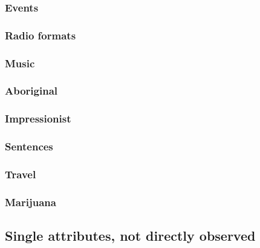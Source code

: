 \documentclass[11pt,letter]{article}
\begin{document}


\subsubsection{Events}



\subsubsection{Radio formats}



\subsubsection{Music}



\subsubsection{Aboriginal}



\subsubsection{Impressionist}



\subsubsection{Sentences}



\subsubsection{Travel}



\subsubsection{Marijuana}



\subsection{Single attributes, not directly observed}
\end{document}
